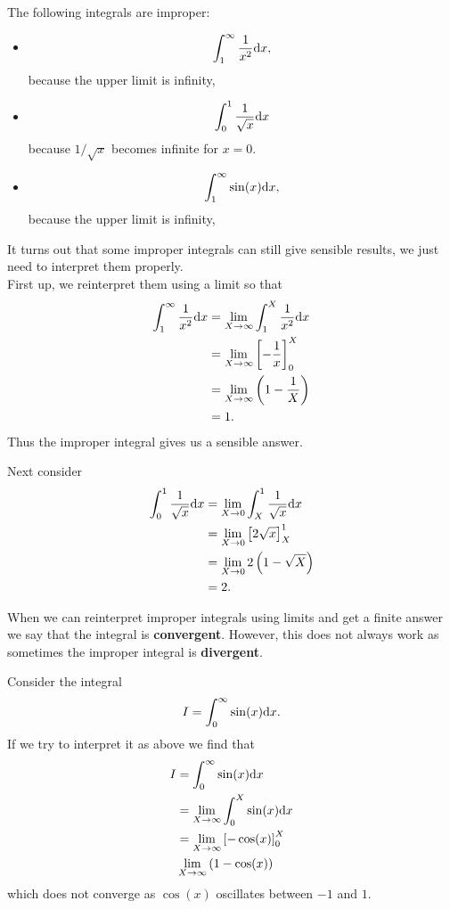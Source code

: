 The following integrals are improper:

\begin{itemize}
\item \begin{equation*}
\int_{1}^{\infty}\frac{1}{x^{2}}\mathrm{d} x,
\end{equation*}
because the upper limit is infinity,
\item \begin{equation*}
\int_{0}^{1}\frac{1}{\sqrt{x}}\mathrm{d} x
\end{equation*}
because $1/\sqrt{x}$ becomes infinite for $x=0$.
\item \begin{equation*}
\int_{1}^{\infty}\sin(x)\mathrm{d} x,
\end{equation*}
because the upper limit is infinity,
\end{itemize}

It turns out that some improper integrals can still give sensible results, we just need to interpret them properly.\\

First up, we reinterpret them using a limit so that
\begin{align*}
\int_{1}^{\infty}\frac{1}{x^{2}}\mathrm{d} x 	&=\lim_{X\to \infty}\int_{1}^{X}\frac{1}{x^{2}}\mathrm{d} x\\
						&=\lim_{X\to \infty}\left[-\frac{1}{x}\right]_{0}^{X}\\
						&=\lim_{X\to \infty}\left(1-\frac{1}{X}\right)\\
						&=1.
\end{align*}
Thus the improper integral gives us a sensible answer.

Next consider
\begin{align*}
\int_{0}^{1}\frac{1}{\sqrt{x}}\mathrm{d} x 	&=\lim_{X\to 0}\int_{X}^{1}\frac{1}{\sqrt{x}}\mathrm{d} x\\
						&=\lim_{X\to 0}\left[2\sqrt{x}\right]_{X}^{1}\\
						&=\lim_{X\to 0}2\left(1-\sqrt{X}\right)\\
						&=2.
\end{align*}

When we can reinterpret improper integrals using limits and get a finite answer we say that the integral is \textbf{convergent}. However, this does not always work as sometimes the improper integral is \textbf{divergent}. 

\begin{ex}
Consider the integral 
\begin{equation*}
I=\int_{0}^{\infty}\sin(x)\mathrm{d} x.
\end{equation*}
If we try to interpret it as above we find that
\begin{align*}
I 	&=\int_{0}^{\infty}\sin(x)\mathrm{d} x\\
	&=\lim_{X\to\infty}\int_{0}^{X}\sin(x)\mathrm{d} x\\
	&=\lim_{X\to\infty}\left[-\cos(x)\right]_{0}^{X}\\
	&\lim_{X\to\infty}\left(1-\cos(x)\right)
\end{align*}
which does not converge as $\cos(x)$ oscillates between $-1$ and $1$.
\end{ex}

